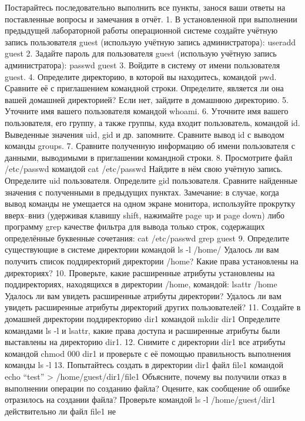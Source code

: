 \documentclass[
  english,
  russian,
  12pt,
  a4paper,
  DIV=11,
  numbers=noendperiod]{scrreprt}
\begin{document}
Постарайтесь последовательно выполнить все пункты, занося ваши ответы на
поставленные вопросы и замечания в отчёт. 1. В установленной при
выполнении предыдущей лабораторной работы операционной системе создайте
учётную запись пользователя guest (использую учётную запись
администратора): useradd guest 2. Задайте пароль для пользователя guest
(использую учётную запись администратора): passwd guest 3. Войдите в
систему от имени пользователя guest. 4. Определите директорию, в которой
вы находитесь, командой pwd. Сравните её с приглашением командной
строки. Определите, является ли она вашей домашней директорией? Если
нет, зайдите в домашнюю директорию. 5. Уточните имя вашего пользователя
командой whoami. 6. Уточните имя вашего пользователя, его группу, а
также группы, куда входит пользователь, командой id. Выведенные значения
uid, gid и др. запомните. Сравните вывод id с выводом команды groups. 7.
Сравните полученную информацию об имени пользователя с данными,
выводимыми в приглашении командной строки. 8. Просмотрите файл
/etc/passwd командой cat /etc/passwd Найдите в нём свою учётную запись.
Определите uid пользователя. Определите gid пользователя. Сравните
найденные значения с полученными в предыдущих пунктах. Замечание: в
случае, когда вывод команды не умещается на одном экране монитора,
используйте прокрутку вверх--вниз (удерживая клавишу shift, нажимайте
page up и page down) либо программу grep качестве фильтра для вывода
только строк, содержащих определённые буквенные сочетания: cat
/etc/passwd \textbar{} grep guest 9. Определите существующие в системе
директории командой ls -l /home/ Удалось ли вам получить список
поддиректорий директории /home? Какие права установлены на директориях?
10. Проверьте, какие расширенные атрибуты установлены на поддиректориях,
находящихся в директории /home, командой: lsattr /home Удалось ли вам
увидеть расширенные атрибуты директории? Удалось ли вам увидеть
расширенные атрибуты директорий других пользователей? 11. Создайте в
домашней директории поддиректорию dir1 командой mkdir dir1 Определите
командами ls -l и lsattr, какие права доступа и расширенные атрибуты
были выставлены на директорию dir1. 12. Снимите с директории dir1 все
атрибуты командой chmod 000 dir1 и проверьте с её помощью правильность
выполнения команды ls -l 13. Попытайтесь создать в директории dir1 файл
file1 командой echo \enquote{test} \textgreater{} /home/guest/dir1/file1
Объясните, почему вы получили отказ в выполнении операции по созданию
файла? Оцените, как сообщение об ошибке отразилось на создании файла?
Проверьте командой ls -l /home/guest/dir1 действительно ли файл file1 не
\end{document}
